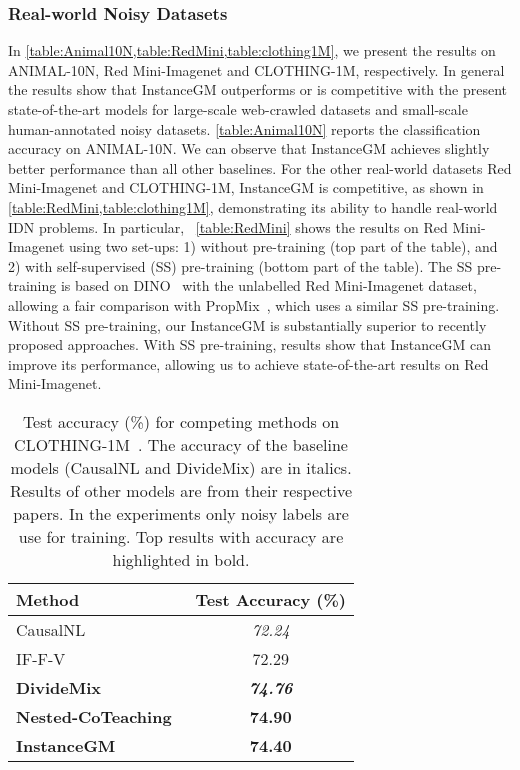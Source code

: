 \documentclass[10pt,twocolumn,letterpaper]{article}
\begin{document}
    \subsubsection{Real-world Noisy Datasets}\label{subsubsec:real_world}
    In \cref{table:Animal10N,table:RedMini,table:clothing1M}, we present the results on ANIMAL-10N, Red Mini-Imagenet and CLOTHING-1M, respectively. In general the results show that InstanceGM outperforms or is competitive with the present state-of-the-art models for large-scale web-crawled datasets and small-scale human-annotated noisy datasets.
\cref{table:Animal10N} reports the classification accuracy on ANIMAL-10N.
We can observe that  InstanceGM achieves slightly better performance than all other baselines. 
    For the other real-world datasets Red Mini-Imagenet and CLOTHING-1M, InstanceGM is competitive, as shown in \cref{table:RedMini,table:clothing1M}, demonstrating its ability to handle real-world IDN problems. In particular, ~\cref{table:RedMini} shows the results on Red Mini-Imagenet using two set-ups: 1) without pre-training (top part of the table), and 2) with self-supervised (SS) pre-training (bottom part of the table).
    The SS pre-training is based on DINO~\cite{caron2021emerging} with the unlabelled Red Mini-Imagenet dataset, allowing a fair comparison with PropMix~\cite{cordeiro2021propmix}, which uses a similar SS pre-training.
Without SS pre-training, our InstanceGM is substantially superior to recently proposed approaches.
    With SS pre-training, results show that InstanceGM can improve its performance, allowing us to achieve state-of-the-art results on Red Mini-Imagenet.
    


    


    \begin{table}
        \centering
        \caption{Test accuracy (\%) for  competing methods on CLOTHING-1M~\cite{xiao2015learning}. The accuracy of the baseline models (CausalNL and DivideMix)  are in italics. 
        Results of other models are from their respective papers. In the experiments only noisy labels are use for training. Top results with  accuracy are highlighted in bold.}
        \label{table:clothing1M}
        \begin{tabular}{l c}
            \toprule
            \bfseries Method & \bfseries Test Accuracy (\%) \\
            \midrule
CausalNL~\cite{yao2021instance} & \textit{72.24} \\
            IF-F-V~\cite{jiang2021information} & 72.29\\
\textbf{DivideMix}~\cite{li2020dividemix} & \textit{\textbf{74.76}} \\
\textbf{Nested-CoTeaching}~\cite{chen2021boosting} & \textbf{74.90}\\
\midrule
            \rowcolor{Gray!25} \textbf{InstanceGM}  & \textbf{74.40} \\
            \bottomrule
        \end{tabular}
\end{table}
    
\end{document}
